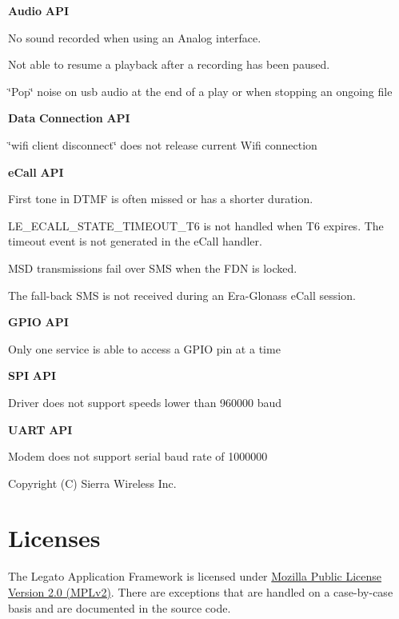 {\bfseries Audio} {\bfseries A\+PI} 
\begin{DoxyItemize}
\item No sound recorded when using an Analog interface.
\item Not able to resume a playback after a recording has been paused.
\item \char`\"{}\+Pop\char`\"{} noise on {\ttfamily usb} audio at the end of a play or when stopping an ongoing file
\end{DoxyItemize}

{\bfseries Data} {\bfseries Connection} {\bfseries A\+PI} 
\begin{DoxyItemize}
\item \char`\"{}wifi client disconnect\char`\"{} does not release current Wifi connection
\end{DoxyItemize}

{\bfseries e\+Call} {\bfseries A\+PI} 
\begin{DoxyItemize}
\item First tone in D\+T\+MF is often missed or has a shorter duration.
\item {\ttfamily L\+E\+\_\+\+E\+C\+A\+L\+L\+\_\+\+S\+T\+A\+T\+E\+\_\+\+T\+I\+M\+E\+O\+U\+T\+\_\+\+T6} is not handled when T6 expires. The timeout event is not generated in the e\+Call handler.
\item M\+SD transmissions fail over S\+MS when the F\+DN is locked.
\item The fall-\/back S\+MS is not received during an Era-\/\+Glonass e\+Call session.
\end{DoxyItemize}

{\bfseries G\+P\+IO} {\bfseries A\+PI} 
\begin{DoxyItemize}
\item Only one service is able to access a G\+P\+IO pin at a time
\end{DoxyItemize}

{\bfseries S\+PI} {\bfseries A\+PI} 
\begin{DoxyItemize}
\item Driver does not support speeds lower than 960000 baud
\end{DoxyItemize}

{\bfseries U\+A\+RT} {\bfseries A\+PI} 
\begin{DoxyItemize}
\item Modem does not support serial baud rate of 1000000
\end{DoxyItemize}

Copyright (C) Sierra Wireless Inc. \hypertarget{aboutLicenses}{}\section{Licenses}\label{aboutLicenses}
The Legato Application Framework is licensed under \hyperlink{aboutLicensesMPLv2}{Mozilla Public License Version 2.0 (M\+P\+Lv2)}. There are exceptions that are handled on a case-\/by-\/case basis and are documented in the source code.


